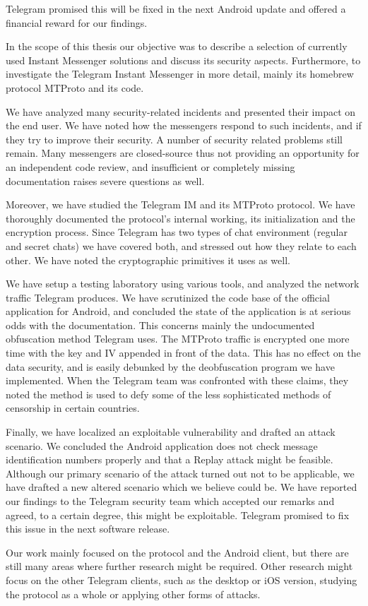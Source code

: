 \documentclass[thesis=M,english]{FITthesis}[2012/10/20]
\begin{document}
Telegram promised this will be fixed in the next Android update and offered a financial reward for our findings.




\begin{conclusion}

In the scope of this thesis our objective was to describe a selection of currently used Instant Messenger solutions and discuss its security aspects. Furthermore, to investigate the Telegram Instant Messenger in more detail, mainly its homebrew protocol MTProto and its code.

We have analyzed many security-related incidents and presented their impact on the end user. We have noted how the messengers respond to such incidents, and if they try to improve their security. A number of security related problems still remain. Many messengers are closed-source thus not providing an opportunity for an independent code review, and insufficient or completely missing documentation raises severe questions as well.

Moreover, we have studied the Telegram IM and its MTProto protocol. We have thoroughly documented the protocol's internal working, its initialization and the encryption process. Since Telegram has two types of chat environment (regular and secret chats) we have covered both, and stressed out how they relate to each other. We have noted the cryptographic primitives it uses as well.

We have setup a testing laboratory using various tools, and analyzed the network traffic Telegram produces. We have scrutinized the code base of the official application for Android, and concluded the state of the application is at serious odds with the documentation. This concerns mainly the undocumented obfuscation method Telegram uses. The MTProto traffic is encrypted one more time with the key and IV appended in front of the data. This has no effect on the data security, and is easily debunked by the deobfuscation program we have implemented. When the Telegram team was confronted with these claims, they noted the method is used to defy some of the less sophisticated methods of censorship in certain countries.

Finally, we have localized an exploitable vulnerability and drafted an attack scenario. We concluded the Android application does not check message identification numbers properly and that a Replay attack might be feasible. Although our primary scenario of the attack turned out not to be applicable, we have drafted a new altered scenario which we believe could be. We have reported our findings to the Telegram security team which accepted our remarks and agreed, to a certain degree, this might be exploitable. Telegram promised to fix this issue in the next software release.

Our work mainly focused on the protocol and the Android client, but there are still many areas where further research might be required. Other research might focus on the other Telegram clients, such as the desktop or iOS version, studying the protocol as a whole or applying other forms of attacks.


\end{conclusion}
\end{document}
